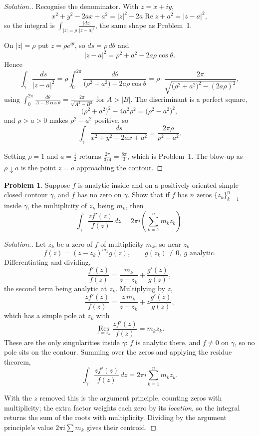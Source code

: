 \documentclass[11pt,a4paper]{article}
\theoremstyle{definition}
\newtheorem{problemx}{Problem}[section]
\newenvironment{problem}{\begin{problemx}}{\end{problemx}}
\newenvironment{solution}
  {\renewcommand{\qedsymbol}{}\begin{proof}[\textit{Solution}.]}
  {\end{proof}}
\begin{document}
\begin{solution}
Recognise the denominator. With $z = x+iy$,
$$x^{2}+y^{2}-2ax+a^{2} = \left|z\right|^{2} - 2a\operatorname{Re}z + a^{2}
= \left|z - a\right|^{2},$$
so the integral is $\displaystyle\int_{\left|z\right|=\rho}
\frac{\left|dz\right|}{\left|z-a\right|^{2}}$, the same shape as Problem~1.

On $\left|z\right| = \rho$ put $z = \rho e^{i\theta}$, so $ds = \rho\,d\theta$ and
$$\left|z-a\right|^{2} = \rho^{2} + a^{2} - 2a\rho\cos\theta .$$
Hence
$$\int_{\gamma}\frac{ds}{\left|z-a\right|^{2}}
= \rho\int^{2\pi}_{0}\frac{d\theta}{\big(\rho^{2}+a^{2}\big) - 2a\rho\cos\theta}
= \rho\cdot\frac{2\pi}{\sqrt{\big(\rho^{2}+a^{2}\big)^{2} - (2a\rho)^{2}}},$$
using $\int^{2\pi}_{0}\frac{d\theta}{A - B\cos\theta} = \frac{2\pi}{\sqrt{A^2-B^2}}$
for $A > \left|B\right|$. The discriminant is a perfect square,
$$\big(\rho^{2}+a^{2}\big)^{2} - 4a^{2}\rho^{2} = \big(\rho^{2}-a^{2}\big)^{2},$$
and $\rho > a > 0$ makes $\rho^{2} - a^{2}$ positive, so
$$\boxed{\int_{\gamma}\frac{ds}{x^{2}+y^{2}-2ax+a^{2}}
= \frac{2\pi\rho}{\rho^{2}-a^{2}} .}$$

Setting $\rho = 1$ and $a = \frac12$ returns $\frac{2\pi}{3/4} = \frac{8\pi}{3}$,
which is Problem~1. The blow-up as $\rho \downarrow a$ is the point $z = a$
approaching the contour.
\end{solution}


\begin{problem}
Suppose $f$ is analytic inside and on a positively oriented simple closed contour
$\gamma$, and $f$ has no zero on $\gamma$. Show that if $f$ has $n$ zeros
$\{z_k\}^{n}_{k=1}$ inside $\gamma$, the multiplicity of $z_k$ being $m_k$, then
$$\int_{\gamma}\frac{z f'(z)}{f(z)}\,dz
= 2\pi i\left(\sum^{n}_{k = 1} m_k z_k\right).$$
\end{problem}

\begin{solution}
Let $z_k$ be a zero of $f$ of multiplicity $m_k$, so near $z_k$
$$f(z) = (z-z_k)^{m_k} g(z),\qquad g(z_k) \neq 0,\ g \text{ analytic}.$$
Differentiating and dividing,
$$\frac{f'(z)}{f(z)} = \frac{m_k}{z - z_k} + \frac{g'(z)}{g(z)},$$
the second term being analytic at $z_k$. Multiplying by $z$,
$$\frac{z f'(z)}{f(z)} = \frac{z\,m_k}{z-z_k} + z\frac{g'(z)}{g(z)},$$
which has a simple pole at $z_k$ with
$$\operatorname*{Res}_{z=z_k}\frac{zf'(z)}{f(z)} = m_k z_k .$$
These are the only singularities inside $\gamma$: $f$ is analytic there, and
$f \neq 0$ on $\gamma$, so no pole sits on the contour. Summing over the zeros and
applying the residue theorem,
$$\boxed{\int_{\gamma}\frac{z f'(z)}{f(z)}\,dz
= 2\pi i\sum^{n}_{k=1} m_k z_k .}$$

With the $z$ removed this is the argument principle, counting zeros with
multiplicity; the extra factor weights each zero by its \emph{location}, so the
integral returns the sum of the roots with multiplicity. Dividing by the argument
principle's value $2\pi i \sum m_k$ gives their centroid.
\end{solution}
\end{document}
